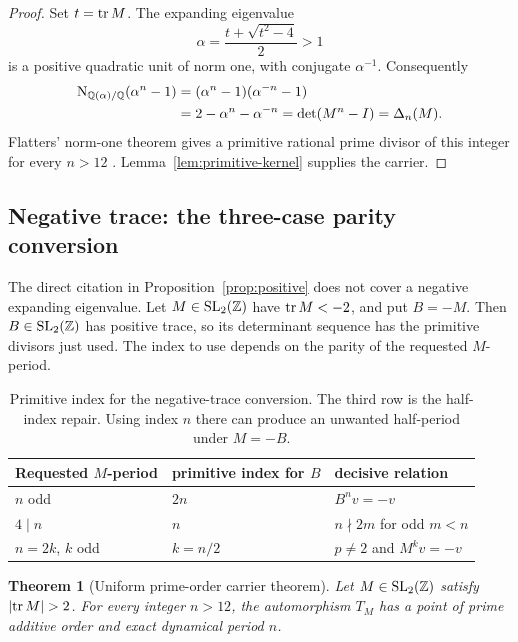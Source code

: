 \documentclass[11pt]{article}
\newtheorem{theorem}{Theorem}[section]
\theoremstyle{definition}
\theoremstyle{remark}
\begin{document}
\begin{proof}
Set \(t=\operatorname{tr} M\).  The expanding eigenvalue
\begin{equation}
  \alpha=\frac{t+\sqrt{t^2-4}}2>1
\end{equation}
is a positive quadratic unit of norm one, with conjugate \(\alpha^{-1}\).
Consequently
\begin{align}
  \operatorname{N}_{\mathbb{Q}(\alpha)/\mathbb{Q}}(\alpha^n-1)
  &=(\alpha^n-1)(\alpha^{-n}-1) \\
  &=2-\alpha^n-\alpha^{-n}
   =\det(M^n-I)=\Delta_n(M).
  \label{eq:norm-det}
\end{align}
Flatters' norm-one theorem gives a primitive rational prime divisor of this
integer for every \(n>12\) \citep[Theorem~1.4]{Flatters2009Primitive}.
Lemma~\ref{lem:primitive-kernel} supplies the carrier.
\end{proof}

\subsection{Negative trace: the three-case parity conversion}

The direct citation in Proposition~\ref{prop:positive} does not cover a
negative expanding eigenvalue.  Let \(M\in\mathrm{SL}_2(\mathbb{Z})\) have
\(\operatorname{tr} M<-2\), and put \(B=-M\).  Then \(B\in\mathrm{SL}_2(\mathbb{Z})\) has positive
trace, so its determinant sequence has the primitive divisors just used.
The index to use depends on the parity of the requested \(M\)-period.

\begin{table}[tbp]
\centering
\caption{Primitive index for the negative-trace conversion.  The third row
is the half-index repair.  Using index \(n\) there can produce an unwanted
half-period under \(M=-B\).}
\label{tab:negative-routing}
\begin{tabular}{@{}lll@{}}
\toprule
Requested \(M\)-period & primitive index for \(B\) & decisive relation \\
\midrule
\(n\) odd & \(2n\) & \(B^n v=-v\) \\
\(4\mid n\) & \(n\) & \(n\nmid2m\) for odd \(m<n\) \\
\(n=2k\), \(k\) odd & \(k=n/2\) & \(p\ne2\) and \(M^kv=-v\) \\
\bottomrule
\end{tabular}
\end{table}

\begin{theorem}[Uniform prime-order carrier theorem]
\label{thm:uniform}
Let \(M\in\mathrm{SL}_2(\mathbb{Z})\) satisfy \(\lvert\operatorname{tr} M\rvert>2\).  For every integer
\(n>12\), the automorphism \(T_M\) has a point of prime additive order and
exact dynamical period \(n\).
\end{theorem}
\end{document}
